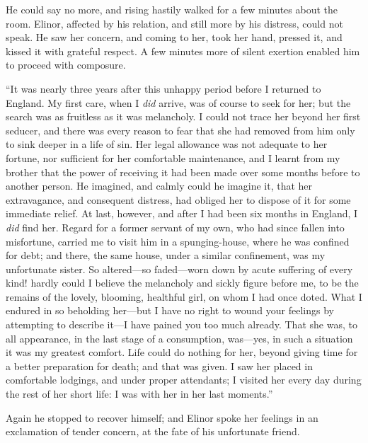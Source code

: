 He could say no more, and rising hastily walked for a few
minutes about the room.  Elinor, affected by his relation,
and still more by his distress, could not speak.  He saw
her concern, and coming to her, took her hand, pressed it,
and kissed it with grateful respect.  A few minutes more
of silent exertion enabled him to proceed with composure.

``It was nearly three years after this unhappy
period before I returned to England.  My first care,
when I \emph{did} arrive, was of course to seek for her;
but the search was as fruitless as it was melancholy.
I could not trace her beyond her first seducer, and there
was every reason to fear that she had removed from him
only to sink deeper in a life of sin.  Her legal allowance
was not adequate to her fortune, nor sufficient for her
comfortable maintenance, and I learnt from my brother that
the power of receiving it had been made over some months
before to another person.  He imagined, and calmly could he
imagine it, that her extravagance, and consequent distress,
had obliged her to dispose of it for some immediate relief.
At last, however, and after I had been six months in England,
I \emph{did} find her.  Regard for a former servant of my own,
who had since fallen into misfortune, carried me to visit
him in a spunging-house, where he was confined for debt;
and there, the same house, under a similar confinement,
was my unfortunate sister.  So altered---so faded---worn
down by acute suffering of every kind! hardly could I
believe the melancholy and sickly figure before me,
to be the remains of the lovely, blooming, healthful girl,
on whom I had once doted.  What I endured in so beholding
her---but I have no right to wound your feelings by attempting
to describe it---I have pained you too much already.
That she was, to all appearance, in the last stage
of a consumption, was---yes, in such a situation it was
my greatest comfort.  Life could do nothing for her,
beyond giving time for a better preparation for death;
and that was given.  I saw her placed in comfortable lodgings,
and under proper attendants; I visited her every day
during the rest of her short life: I was with her in her
last moments.''

Again he stopped to recover himself; and Elinor
spoke her feelings in an exclamation of tender concern,
at the fate of his unfortunate friend.


